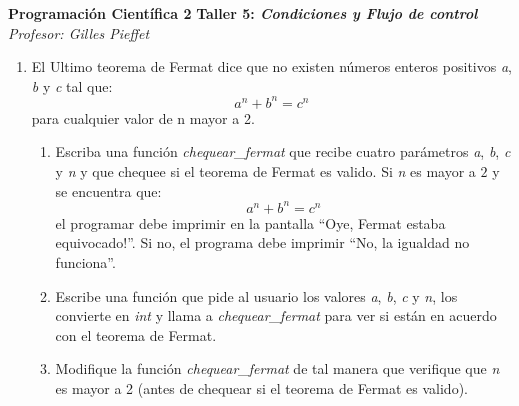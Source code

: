 \documentclass[10pt, twocolumn]{article}
\begin{document}
\noindent
{\Large \bf Programación Científica 2}
\vskip 0.3cm
\noindent
{\large \bf Taller 5: {\it Condiciones y Flujo de control}}
\vskip 0.2cm
\noindent
{\it Profesor:  Gilles Pieffet}\\


\noindent
\begin{enumerate}
\item El Ultimo teorema de Fermat dice que no existen números enteros positivos \emph{a}, \emph{b} y \emph{c} tal que:
\[ a^n + b^n = c^n \]
para cualquier valor de n mayor a 2.
\begin{enumerate}
	\item Escriba una función \emph{chequear\_fermat} que recibe cuatro parámetros \emph{a}, \emph{b}, \emph{c} y \emph{n} y que chequee si el teorema de Fermat es valido. Si \emph{n} es mayor a $2$ y se encuentra que:
	\[ a^n + b^n = c^n \]
	el programar debe imprimir en la pantalla ``Oye, Fermat estaba equivocado!''. Si no, el programa debe imprimir ``No, la igualdad no funciona''.
	\item Escribe una función que pide al usuario los valores \emph{a}, \emph{b}, \emph{c} y \emph{n}, los convierte en \emph{int} y llama a \emph{chequear\_fermat} para ver si están en acuerdo con el teorema de Fermat.
	\item Modifique la función \emph{chequear\_fermat} de tal manera que verifique que \emph{n} es mayor a 2 (antes de chequear si el teorema de Fermat es valido).
\end{enumerate}


\end{enumerate}
\end{document}
